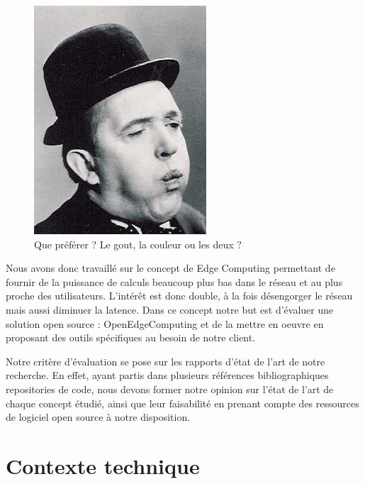\documentclass[twocolumn,a4paper]{IEEEtranfr}
\begin{document}
\begin{figure}[htpb]
  \begin{center}
    \includegraphics[width=0.7\columnwidth] {../images/SLaurel.jpg}
  \end{center}
  \caption{Que préférer ? Le gout, la couleur ou les deux ?  }
  \label{fig:gouts}
\end{figure}

Nous avons donc travaillé sur le concept de Edge Computing permettant de fournir de la puissance de calculs beaucoup plus bas dans le réseau et au plus proche des utilisateurs. L'intérêt est donc double, à la fois désengorger le réseau mais aussi diminuer la latence.
Dans ce concept notre but est d’évaluer une solution open source : OpenEdgeComputing et de la mettre en oeuvre en proposant des outils spécifiques au besoin de notre client.

Notre critère d’évaluation se pose sur les rapports d’état de l’art de notre recherche. En effet, ayant partis dans plusieurs références bibliographiques repositories de code, nous devons former notre opinion sur l’état de l’art de chaque concept étudié, ainsi que leur faisabilité en prenant compte des ressources de logiciel open source à notre disposition.

\section{Contexte technique}
\end{document}
